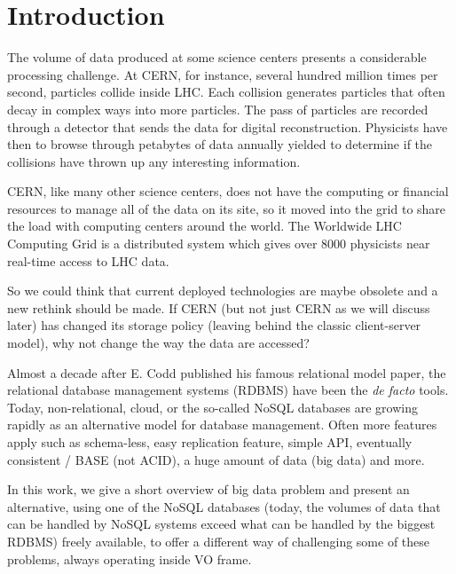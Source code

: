 \chapter{Introduction}


The volume of data produced at some science centers presents a considerable processing challenge. At CERN, for instance, several hundred million times per second, particles collide inside LHC. Each collision generates particles that often decay in complex ways into more particles. The pass of particles are recorded through a detector that sends the data for digital reconstruction. Physicists have then to browse through petabytes of data annually yielded to determine if the collisions have thrown up any interesting information.

CERN, like many other science centers, does not have the computing or financial resources to manage all of the data on its site, so it moved into the grid to share the load with computing centers around the world. The Worldwide LHC Computing Grid is a distributed system which gives over 8000 physicists near real-time access to LHC data.

So we could think that current deployed technologies are maybe obsolete and a new rethink should be made. If CERN (but not just CERN as we will discuss later) has changed its storage policy (leaving behind the classic client-server model), why not change the way the data are accessed? 

Almost a decade after E. Codd published his famous relational model paper, the relational database management systems (RDBMS) have been the \textit{de facto} tools. Today, non-relational, cloud, or the so-called NoSQL databases are growing rapidly as an alternative model for database management. Often more features apply such as schema-less, easy replication feature, simple API, eventually consistent / BASE (not ACID), a huge amount of data (big data) and more. 

In this work, we give a short overview of big data problem and present an alternative, using one of the NoSQL databases (today, the volumes of data that can be handled by NoSQL systems exceed what can be handled by the biggest RDBMS) freely available, to offer a different way of challenging some of these problems, always operating inside VO frame.